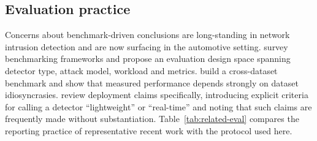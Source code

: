 \documentclass[preprint,11pt,authoryear]{elsarticle}
\begin{document}
\subsection{Evaluation practice}

Concerns about benchmark-driven conclusions are long-standing in network intrusion detection
\citep{flood2024baddesign,goldschmidt2025datasets} and are now surfacing in the automotive setting.
\citet{sharmin2024benchmarking} survey benchmarking frameworks and propose an evaluation design
space spanning detector type, attack model, workload and metrics. \citet{koltai2026cantrust} build a
cross-dataset benchmark and show that measured performance depends strongly on dataset
idiosyncrasies. \citet{ghadi2026survey} review deployment claims specifically, introducing explicit
criteria for calling a detector ``lightweight'' or ``real-time'' and noting that such claims are
frequently made without substantiation. Table~\ref{tab:related-eval} compares the reporting practice
of representative recent work with the protocol used here.
\end{document}
